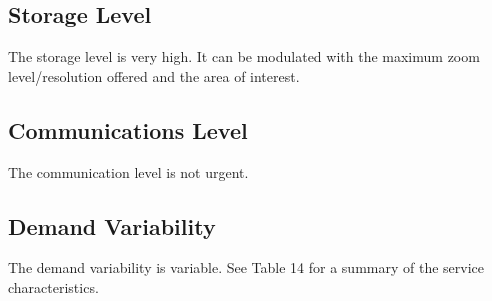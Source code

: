 \subsection{Storage Level}

The storage level is very high. It can be modulated with the maximum zoom level/resolution offered and the area of interest.
\subsection{Communications Level}
The communication level is not urgent.
\subsection{Demand Variability}
The demand variability is variable. See Table 14 for a summary of the service characteristics.
